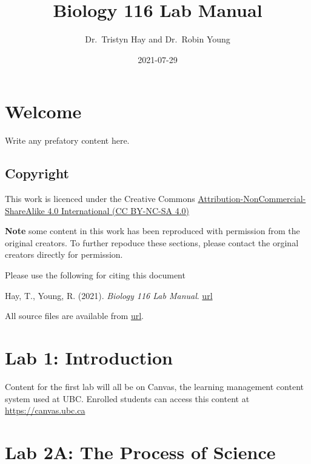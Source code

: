 \documentclass[
]{book}
\title{Biology 116 Lab Manual}
\author{Dr.~Tristyn Hay and Dr.~Robin Young}
\date{2021-07-29}
\begin{document}
\maketitle

{
\setcounter{tocdepth}{1}
\tableofcontents
}
\hypertarget{welcome}{%
\chapter*{Welcome}\label{welcome}}

Write any prefatory content here.

\hypertarget{copyright}{%
\section*{Copyright}\label{copyright}}

This work is licenced under the Creative Commons \href{https://creativecommons.org/licenses/by-nc-sa/4.0/}{Attribution-NonCommercial-ShareAlike 4.0 International (CC BY-NC-SA 4.0)}

\textbf{Note} some content in this work has been reproduced with permission from the original creators. To further repoduce these sections, please contact the orginal creators directly for permission.

Please use the following for citing this document

Hay, T., Young, R. (2021). \emph{Biology 116 Lab Manual}. \href{}{url}

All source files are available from \href{}{url}.

\hypertarget{lab-1-introduction}{%
\chapter*{Lab 1: Introduction}\label{lab-1-introduction}}

Content for the first lab will all be on Canvas, the learning management content system used at UBC. Enrolled students can access this content at \url{https://canvas.ubc.ca}

\hypertarget{lab-2a-the-process-of-science}{%
\chapter*{Lab 2A: The Process of Science}\label{lab-2a-the-process-of-science}}
\end{document}
